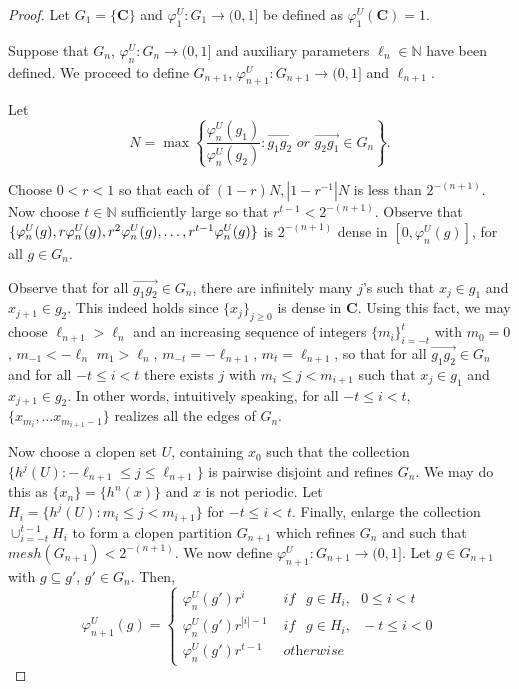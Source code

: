 \documentclass[11pt]{amsart}
\newcommand{\N}{\mathbb{N}}  %
\newcommand{\oa}{\overrightarrow}
\newcommand{\cantor}{\mathbf C}
\begin{document}
{\begin{proof}
    Let $G_1= \{\cantor\}$ and $\varphi^U_1:G_1 \rightarrow (0,1]$ be defined as $\varphi^U_1(\cantor) =1$.

    Suppose that $G_n$, $\varphi^U_n: G_n \rightarrow (0,1]$ and auxiliary parameters $\ell_n \in \N$ have been defined. We proceed to define $G_{n+1}$, $\varphi^U_{n+1}: G_{n+1} \rightarrow (0,1]$ and $\ell_{n+1}$. 
    
  Let \[  N =  \max  \left \{ \frac{\varphi^U_n(g_1)}{\varphi^U_n(g_2)}: \oa{g_1g_2} \textit { or } \oa{g_2g_1} \in G_n \right \}.\]
    
    Choose $0 < r <1$ so that each of $(1-r)N, |1-r^{-1}|N$ is less than $2^{-(n+1)}$. Now choose $ t \in \N$ sufficiently large so that $r^{t-1}< 2^{-(n+1)}$. Observe that  $\{\varphi^U_n(g), r\varphi^U_n(g), r^2 \varphi^U_n(g), \ldots,\\ r^{t-1} \varphi^U_n(g)\}$ is $2^{-(n+1)}$ dense in $[0, \varphi^U_n(g)]$, for all $g \in G_n$.


Observe that for all $\oa{g_1g_2} \in G_n$, there are infinitely many $j$'s  such that $x_j \in g_1$ and $x_{j+1} \in g_2$. This indeed holds since $\{x_j\}_{j \ge 0}$ is dense in $\cantor$. Using this fact, we may choose $\ell_{n+1} > \ell_n$ and an increasing sequence of integers $\{m_i\}_{i=-t}^t$ with $m_0 =0$, $m_{-1} < -\ell_n$ $m_1> \ell_n$,  $m_{-t} = -\ell_{n+1}$, $m_t = \ell_{n+1}$,  so that for all    $\oa{g_1g_2} \in G_n$ and for all $-t \le i < t$  there exists $j$ with $m_i \le j < m_{i+1}$ such that $x_j \in g_1$ and $x_{j+1} \in g_2$. In other words, intuitively speaking, for all $-t \le i < t$, $\{x_{m_i}, \ldots x_{m_{i+1}-1}\}$ realizes all the edges of $G_n$.
     
 Now choose  a clopen set $U$, containing $x_{0}$ such that the collection $\{h^j(U):-\ell_{n+1} \le j \le \ell_{n+1}\}$ is pairwise disjoint and refines $G_n$. We may do this as $\{x_n\} =\{h^n(x)\}$ and $x$ is not periodic. Let $H_i =\{h^j(U): m_i \le j <m_{i+1} \}$ for $-t \leq i<t$. Finally, enlarge the collection $\cup_{i=-t}^{t-1}H_i$ to form a clopen partition $G_{n+1}$ which refines $G_n$ and such that $mesh (G_{n+1})< 2^{-(n+1)}$. 
    We now define $\varphi^U_{n+1}: G_{n+1} \rightarrow (0,1]$. Let $g \in G_{n+1}$ with $g \subseteq g'$, $g' \in G_n$. Then,
    \[ \varphi^U_{n+1}(g) = \begin{cases} 
          \varphi^U_n(g') r^{i }&  \textit { if }  \ \ g \in H_{i},\ \ \ 
           0 \le i < t  \ \ \ \\
           \varphi^U_n(g') r^{|i| -1 }&  \textit { if }  \ \ g \in H_{i},  \ \ \ 
           -t \le i < 0 \\
          \varphi^U_n(g') r^{t-1} & \textit{ otherwise }
       \end{cases}
    \]
     


\end{proof}}
\end{document}

